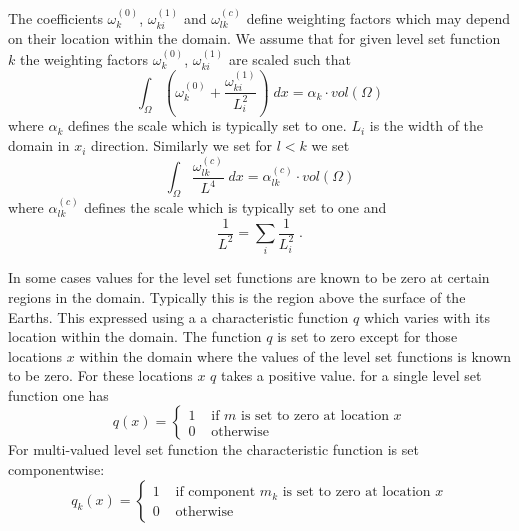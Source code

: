 The coefficients $\omega^{(0)}_k$, $\omega^{(1)}_{ki}$ and $\omega^{(c)}_{lk}$ define weighting factors which 
may depend on their location within the domain. We assume that for given level set function $k$ the 
weighting factors $\omega^{(0)}_k$, $\omega^{(1)}_{ki}$ are scaled such that 
\begin{equation}\label{ref:EQU:REG:5}
\int_{\Omega} ( \omega^{(0)}_k  + \frac{\omega^{(1)}_{ki}}{L_i^2} ) \; dx = \alpha_k \cdot  vol(\Omega)
\end{equation} 
where $\alpha_k$ defines the scale which is typically set to one. $L_i$ is the width of the domain in $x_i$ direction.
Similarly we set for $l<k$ we set 
\begin{equation}\label{ref:EQU:REG:6}
\int_{\Omega} \frac{\omega^{(c)}_{lk}}{L^4} \; dx = \alpha^{(c)}_{lk} \cdot  vol(\Omega)
\end{equation} 
where $\alpha^{(c)}_{lk}$ defines the scale which is typically set to one and
\begin{equation}\label{ref:EQU:REG:6b}
\frac{1}{L^2} = \sum_i \frac{1}{L_i^2} \;.
\end{equation} 

In some cases values for the level set functions are known to be zero at certain regions in the domain. Typically this is the region 
above the surface of the Earths. This expressed using a
a characteristic function $q$ which varies with its location within the domain. The function $q$ is set to zero except for those 
locations $x$ within the domain where the values of the level set functions is known to be zero. For these locations $x$
$q$ takes a positive value. for a single level set function one has
\begin{equation}\label{ref:EQU:REG:7}
q(x) = \left\{ 
\begin{array}{rl}
  1 & \mbox{ if } m \mbox{ is set to zero at location } x \\
  0 & \mbox{ otherwise }
\end{array}
\right.
\end{equation} 
For multi-valued level set function the  characteristic function is set componentwise:
\begin{equation}\label{ref:EQU:REG:7b}
q_k(x) = \left\{ 
\begin{array}{rl}
  1 & \mbox{ if component } m_k \mbox{ is set to zero at location } x \\
  0 & \mbox{ otherwise }
\end{array}
\right.
\end{equation} 


